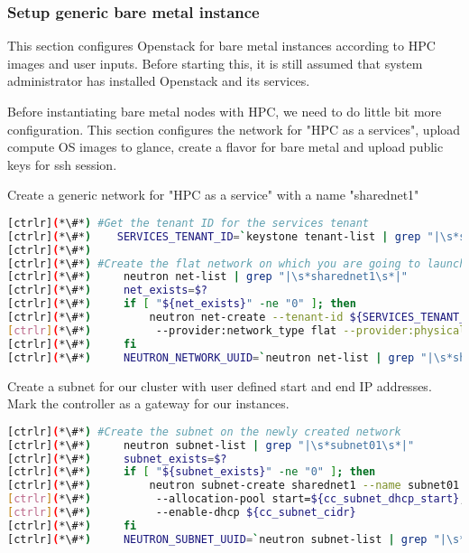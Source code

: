 \subsubsection{Setup generic bare metal instance}

	This section configures Openstack for bare metal instances according to HPC images and user inputs. Before starting this, it is still assumed that system administrator has installed Openstack and its services.

	Before instantiating bare metal nodes with HPC, we need to do little bit more configuration. This section configures the network for "HPC as a services", upload compute OS images to glance, create a flavor for bare metal and upload public keys for ssh session.

	Create a generic network for "HPC as a service" with a name "sharednet1"

\begin{lstlisting}[language=bash,keywords={}]
[ctrlr](*\#*) #Get the tenant ID for the services tenant
[ctrlr](*\#*)    SERVICES_TENANT_ID=`keystone tenant-list | grep "|\s*services\s*|" | awk '{print $2}'`
[ctrlr](*\#*) 
[ctrlr](*\#*) #Create the flat network on which you are going to launch instances
[ctrlr](*\#*)     neutron net-list | grep "|\s*sharednet1\s*|"
[ctrlr](*\#*)     net_exists=$?
[ctrlr](*\#*)     if [ "${net_exists}" -ne "0" ]; then
[ctrlr](*\#*)         neutron net-create --tenant-id ${SERVICES_TENANT_ID} sharednet1 --shared \
[ctrlr](*\#*)          --provider:network_type flat --provider:physical_network physnet1
[ctrlr](*\#*)     fi
[ctrlr](*\#*)     NEUTRON_NETWORK_UUID=`neutron net-list | grep "|\s*sharednet1\s*|" | awk '{print $2}'`
\end{lstlisting}


	Create a subnet for our cluster with user defined start and end IP addresses. Mark the controller as a gateway for our instances.


\begin{lstlisting}[language=bash,keywords={}]
[ctrlr](*\#*) #Create the subnet on the newly created network
[ctrlr](*\#*)     neutron subnet-list | grep "|\s*subnet01\s*|"
[ctrlr](*\#*)     subnet_exists=$?
[ctrlr](*\#*)     if [ "${subnet_exists}" -ne "0" ]; then
[ctrlr](*\#*)         neutron subnet-create sharednet1 --name subnet01 --ip-version=4 --gateway=${controller_ip} \
[ctrlr](*\#*)          --allocation-pool start=${cc_subnet_dhcp_start},end=${cc_subnet_dhcp_end} \
[ctrlr](*\#*)          --enable-dhcp ${cc_subnet_cidr}
[ctrlr](*\#*)     fi
[ctrlr](*\#*)     NEUTRON_SUBNET_UUID=`neutron subnet-list | grep "|\s*subnet01\s*|" | awk '{print $2}'`
\end{lstlisting} 

